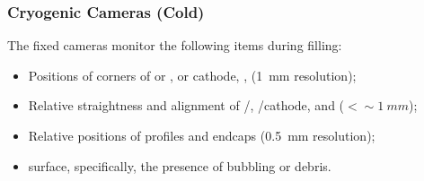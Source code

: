 
\subsubsection{Cryogenic Cameras (Cold)}

The fixed cameras
monitor the following items during filling:
\begin{itemize}
\item Positions of corners of  or ,  or cathode, ,  (\SI{1}{mm} resolution);
\item Relative straightness and alignment of /, /cathode, and  (\(<\sim\SI{1}{mm}\));
\item Relative positions of profiles and endcaps (\SI{0.5}{mm} resolution);
\item \lar surface, specifically, the presence of bubbling or debris.
\end{itemize}




